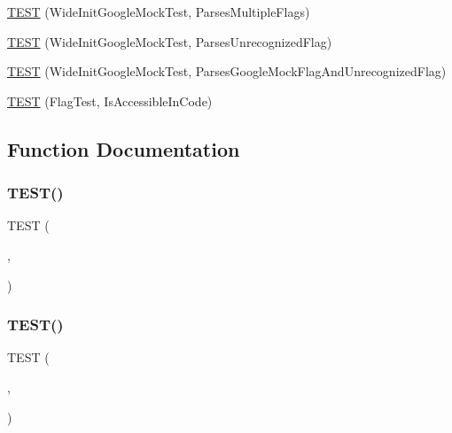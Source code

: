 \begin{DoxyCompactItemize}
\item 
\mbox{\hyperlink{googletest-master_2googlemock_2test_2gmock__test_8cc_a00a9cde83573de9c598297cb89020e69}{T\+E\+ST}} (Wide\+Init\+Google\+Mock\+Test, Parses\+Multiple\+Flags)
\item 
\mbox{\hyperlink{googletest-master_2googlemock_2test_2gmock__test_8cc_a29f97c351b2c31a05b34d7c63bb06392}{T\+E\+ST}} (Wide\+Init\+Google\+Mock\+Test, Parses\+Unrecognized\+Flag)
\item 
\mbox{\hyperlink{googletest-master_2googlemock_2test_2gmock__test_8cc_a6d85c181697be8603091b049564cf5c6}{T\+E\+ST}} (Wide\+Init\+Google\+Mock\+Test, Parses\+Google\+Mock\+Flag\+And\+Unrecognized\+Flag)
\item 
\mbox{\hyperlink{googletest-master_2googlemock_2test_2gmock__test_8cc_a737c00dcd21d5b1ef3d9299cab7a51d3}{T\+E\+ST}} (Flag\+Test, Is\+Accessible\+In\+Code)
\end{DoxyCompactItemize}


\subsection{Function Documentation}
\mbox{\label{googletest-master_2googlemock_2test_2gmock__test_8cc_a7c86c6c98b72e903135c1b01370a13f3}} 
\subsubsection{\texorpdfstring{TEST()}{TEST()}\hspace{0.1cm}{\footnotesize\ttfamily [1/13]}}
{\footnotesize\ttfamily T\+E\+ST (\begin{DoxyParamCaption}\item[{Init\+Google\+Mock\+Test}]{,  }\item[{Parses\+Invalid\+Command\+Line}]{ }\end{DoxyParamCaption})}

\mbox{\label{googletest-master_2googlemock_2test_2gmock__test_8cc_a29b51be89eb52fa64713438ecf4ab924}} 
\subsubsection{\texorpdfstring{TEST()}{TEST()}\hspace{0.1cm}{\footnotesize\ttfamily [2/13]}}
{\footnotesize\ttfamily T\+E\+ST (\begin{DoxyParamCaption}\item[{Init\+Google\+Mock\+Test}]{,  }\item[{Parses\+Empty\+Command\+Line}]{ }\end{DoxyParamCaption})}

